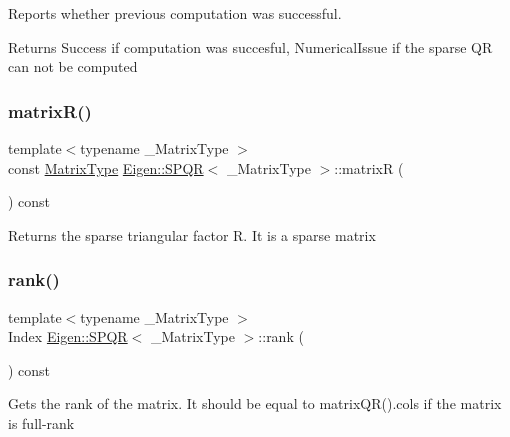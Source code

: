 Reports whether previous computation was successful. 

\begin{DoxyReturn}{Returns}
{\ttfamily Success} if computation was succesful, {\ttfamily Numerical\+Issue} if the sparse QR can not be computed 
\end{DoxyReturn}
\mbox{\label{class_eigen_1_1_s_p_q_r_ad51661be35674dd6a65e27699dbb3fb9}} 
\subsubsection{\texorpdfstring{matrixR()}{matrixR()}}
{\footnotesize\ttfamily template$<$typename \+\_\+\+Matrix\+Type $>$ \\
const \mbox{\hyperlink{class_eigen_1_1_sparse_matrix}{Matrix\+Type}} \mbox{\hyperlink{class_eigen_1_1_s_p_q_r}{Eigen\+::\+S\+P\+QR}}$<$ \+\_\+\+Matrix\+Type $>$\+::matrixR (\begin{DoxyParamCaption}{ }\end{DoxyParamCaption}) const\hspace{0.3cm}{\ttfamily [inline]}}

\begin{DoxyReturn}{Returns}
the sparse triangular factor R. It is a sparse matrix 
\end{DoxyReturn}
\mbox{\label{class_eigen_1_1_s_p_q_r_a539b394ddb4894089e6634c744ea2ddc}} 
\subsubsection{\texorpdfstring{rank()}{rank()}}
{\footnotesize\ttfamily template$<$typename \+\_\+\+Matrix\+Type $>$ \\
Index \mbox{\hyperlink{class_eigen_1_1_s_p_q_r}{Eigen\+::\+S\+P\+QR}}$<$ \+\_\+\+Matrix\+Type $>$\+::rank (\begin{DoxyParamCaption}{ }\end{DoxyParamCaption}) const\hspace{0.3cm}{\ttfamily [inline]}}

Gets the rank of the matrix. It should be equal to matrix\+Q\+R().cols if the matrix is full-\/rank \mbox{\label{class_eigen_1_1_s_p_q_r_a775e28a44fd466638114edbcd17ea50a}} 
